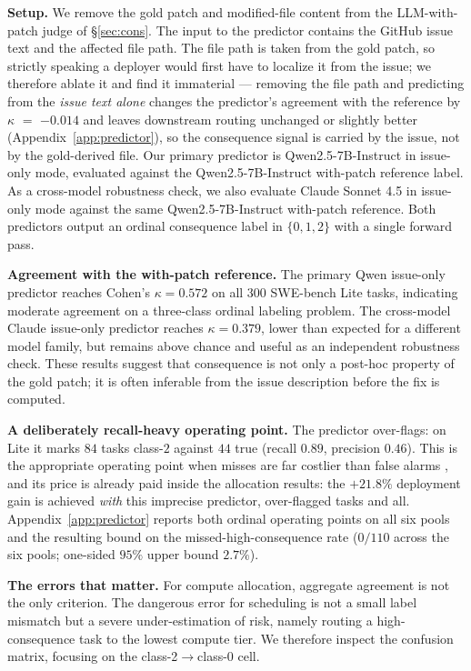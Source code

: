 \documentclass{article}
\begin{document}
\textbf{Setup.} We remove the gold patch and modified-file content from the LLM-with-patch judge of \S\ref{sec:cons}. The input to the predictor contains the GitHub issue text and the affected file path. The file path is taken from the gold patch, so strictly speaking a deployer would first have to localize it from the issue; we therefore ablate it and find it immaterial --- removing the file path and predicting from the \emph{issue text alone} changes the predictor's agreement with the reference by $\kappa$ $=$ $-0.014$ and leaves downstream routing unchanged or slightly better (Appendix~\ref{app:predictor}), so the consequence signal is carried by the issue, not by the gold-derived file. Our primary predictor is Qwen2.5-7B-Instruct in issue-only mode, evaluated against the Qwen2.5-7B-Instruct with-patch reference label. As a cross-model robustness check, we also evaluate Claude Sonnet 4.5 in
issue-only mode against the same Qwen2.5-7B-Instruct with-patch reference. Both predictors output an ordinal consequence label in $\{0,1,2\}$ with a single forward pass.

\textbf{Agreement with the with-patch reference.} The primary Qwen
issue-only predictor reaches Cohen's $\kappa = 0.572$ on all $300$ SWE-bench Lite tasks, indicating moderate agreement on a three-class ordinal labeling problem. The cross-model Claude issue-only predictor reaches $\kappa = 0.379$, lower than expected for a
different model family, but remains above chance and useful as an independent robustness check. These results suggest that consequence is not only a post-hoc property of the gold patch; it is often inferable from the issue description before the fix is computed.

\textbf{A deliberately recall-heavy operating point.} The predictor
over-flags: on Lite it marks $84$ tasks class-$2$ against $44$ true
(recall $0.89$, precision $0.46$). This is the appropriate operating
point when misses are far costlier than false alarms
\citep{elkan2001foundations}, and its price is already paid inside
the allocation results: the $+21.8\%$ deployment gain is achieved
\emph{with} this imprecise predictor, over-flagged tasks and all.
Appendix~\ref{app:predictor} reports both ordinal operating points on
all six pools and the resulting bound on the missed-high-consequence
rate ($0/110$ across the six pools; one-sided $95\%$ upper bound $2.7\%$).

\textbf{The errors that matter.} For compute allocation, aggregate agreement is not the only criterion. The dangerous error for scheduling is not a small
label mismatch but a severe under-estimation of risk, namely routing a
high-consequence task to the lowest compute tier. We therefore inspect
the confusion matrix, focusing on the class-2$\to$class-0 cell.
\end{document}
